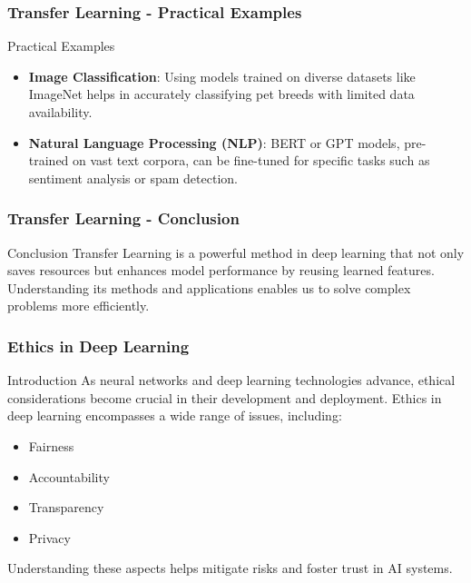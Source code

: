 \documentclass[aspectratio=169]{beamer}
\begin{document}
\begin{frame}[fragile]
    \frametitle{Transfer Learning - Practical Examples}
    \begin{block}{Practical Examples}
        \begin{itemize}
            \item \textbf{Image Classification}: Using models trained on diverse datasets like ImageNet helps in accurately classifying pet breeds with limited data availability.
            \item \textbf{Natural Language Processing (NLP)}: BERT or GPT models, pre-trained on vast text corpora, can be fine-tuned for specific tasks such as sentiment analysis or spam detection.
        \end{itemize}
    \end{block}
\end{frame}

\begin{frame}[fragile]
    \frametitle{Transfer Learning - Conclusion}
    \begin{block}{Conclusion}
        Transfer Learning is a powerful method in deep learning that not only saves resources but enhances model performance by reusing learned features. Understanding its methods and applications enables us to solve complex problems more efficiently.
    \end{block}
\end{frame}

\begin{frame}[fragile]
    \frametitle{Ethics in Deep Learning}
    \begin{block}{Introduction}
        As neural networks and deep learning technologies advance, ethical considerations become crucial in their development and deployment. Ethics in deep learning encompasses a wide range of issues, including:
        \begin{itemize}
            \item Fairness
            \item Accountability
            \item Transparency
            \item Privacy
        \end{itemize}
        Understanding these aspects helps mitigate risks and foster trust in AI systems.
    \end{block}
\end{frame}
\end{document}
